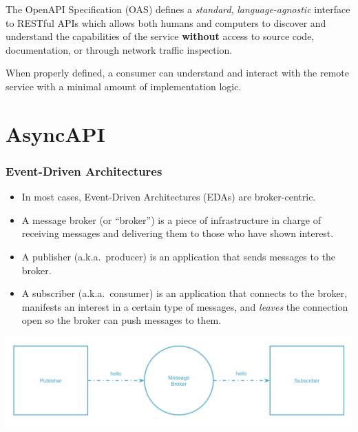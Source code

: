 \documentclass{efd-lecture}
\begin{document}
\begin{frame}
  \begin{itemize}
    \begin{block}{}
      The OpenAPI Specification (OAS) defines a \textit{\color{YelloOrange}standard},
      \textit{\color{LimeGreen}language-agnostic} interface
      to RESTful APIs which allows both humans and computers to discover and understand
      the capabilities of the service \textbf{\color{RubineRed}without} access to source code, documentation,
      or through network traffic inspection.
    \end{block}
    \begin{block}{}
      When properly defined, a consumer can understand and interact with the remote service
      with a minimal amount of implementation logic.
    \end{block}
  \end{itemize}
\end{frame}

\section{AsyncAPI}

\begin{frame}
  \frametitle{Event-Driven Architectures}
  \begin{itemize}
    \item In most cases, Event-Driven Architectures (EDAs) are broker-centric.
    \item A message broker (or ``broker'') is a piece of infrastructure in charge of receiving messages and delivering them to those who have shown interest.
    \item A publisher (a.k.a.\ producer) is an application that sends messages to the broker.
    \item A subscriber (a.k.a.\ consumer) is an application that connects to the broker, manifests an interest in a certain type of messages,
      and \textit{\color{YellowOrange}leaves} the connection open so the broker can push messages to them.
  \end{itemize}
  \includegraphics[width=\textwidth]{./img/simple-event-driven.png}
\end{frame}
\end{document}
